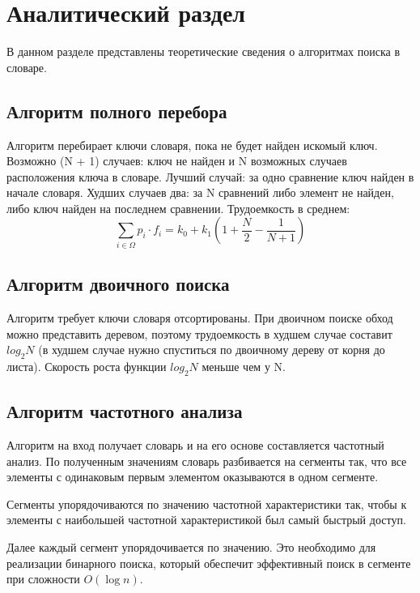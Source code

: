 \chapter{Аналитический раздел}
\label{cha:analysis}

В данном разделе представлены теоретические сведения о
алгоритмах поиска в словаре.

\section{Алгоритм полного перебора}

Алгоритм перебирает ключи словаря, пока не будет найден искомый ключ.
Возможно (N + 1) случаев: ключ не найден и N возможных случаев расположения ключа в словаре.
Лучший случай: за одно сравнение ключ найден в начале словаря.
Худших случаев два: за N сравнений либо элемент не найден, либо ключ найден на последнем сравнении.
Трудоемкость в среднем:
\begin{equation}
    \sum\limits_{i\in\Omega} p_i\cdot f_i =
    k_0+k_1(1+\frac{N}{2}-\frac{1}{N+1})
\end{equation}


\section{Алгоритм двоичного поиска}

Алгоритм требует ключи словаря отсортированы.
При двоичном поиске обход можно представить деревом, поэтому трудоемкость в худшем случае составит $log_2N$
(в худшем случае нужно спуститься по двоичному дереву от корня до листа).
Скорость роста функции $log_2N$ меньше чем у N.


\section{Алгоритм частотного анализа}

Алгоритм на вход получает словарь и на его основе составляется частотный анализ. По полученным значениям словарь разбивается на сегменты так, что все элементы с одинаковым первым элементом оказываются в одном сегменте. 

Сегменты упорядочиваются по значению частотной характеристики так, чтобы к элементы с наибольшей частотной характеристикой был самый быстрый доступ. 

Далее каждый сегмент упорядочивается по значению. Это необходимо для реализации бинарного поиска, который обеспечит эффективный поиск в сегменте при сложности $O(\log n)$.

